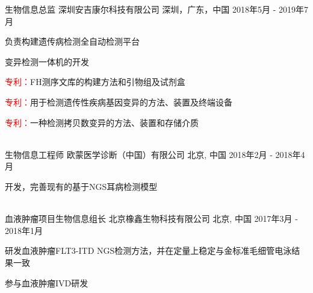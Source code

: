 

\begin{cventries}

  \cventry
    {生物信息总监} %
    {深圳安吉康尔科技有限公司} %
    {深圳，广东，中国} %
    {2018年5月 - 2019年7月} %
    {
      \begin{cvitems} %
        \item {负责构建遗传病检测全自动检测平台}
        \item {变异检测一体机的开发}
        \item {\textcolor{red}{专利：}FH测序文库的构建方法和引物组及试剂盒 }
        \item {\textcolor{red}{专利：}用于检测遗传性疾病基因变异的方法、装置及终端设备}
        \item {\textcolor{red}{专利：}一种检测拷贝数变异的方法、装置和存储介质 }
      \end{cvitems}
    }\\

  \cventry
    {生物信息工程师} %
    {欧蒙医学诊断（中国）有限公司} %
    {北京, 中国} %
    {2018年2月 - 2018年4月} %
    {
      \begin{cvitems} %
        \item {开发，完善现有的基于NGS耳病检测模型}
      \end{cvitems}
    } \\

  \cventry
    {血液肿瘤项目生物信息组长} %
    {北京橡鑫生物科技有限公司} %
    {北京, 中国} %
    {2017年3月 - 2018年1月} %
    {
      \begin{cvitems} %
        \item {研发血液肿瘤FLT3-ITD NGS检测方法，并在定量上稳定与金标准毛细管电泳结果一致}
        \item {参与血液肿瘤IVD研发}
      \end{cvitems}
    }\\


\end{cventries}
